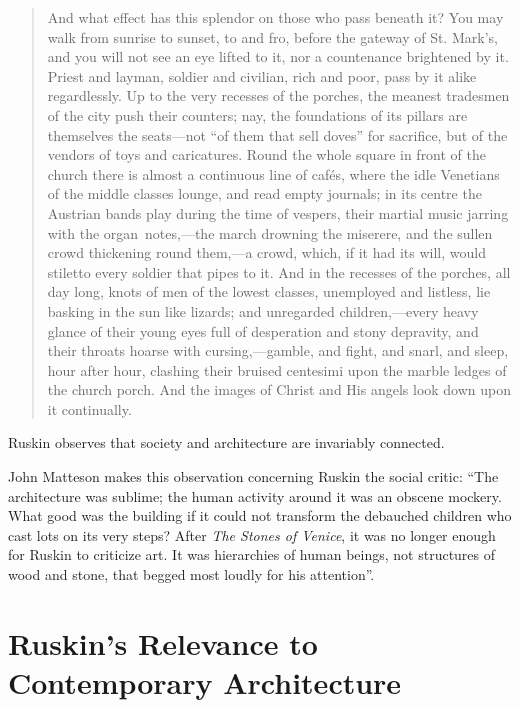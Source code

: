 \begin{quote}
And what effect has this splendor on those who pass beneath it?  You may
walk from sunrise to sunset, to and fro, before the gateway of St.
Mark’s, and you will not see an eye lifted to it, nor a countenance
brightened by it.  Priest and layman, soldier and civilian, rich and
poor, pass by it alike regardlessly.  Up to the very recesses of the
porches, the meanest tradesmen of the city push their counters; nay,
the foundations of its pillars are themselves the seats—not “of them
that sell doves” for sacrifice, but of the vendors of toys and
caricatures.  Round the whole square in front of the church there is
almost a continuous line of cafés, where the idle Venetians of the
middle classes lounge, and read empty journals; in its centre the
Austrian bands play during the time of vespers, their martial music
jarring with the organ~notes,—the march drowning the miserere, and the
sullen crowd thickening round them,—a crowd, which, if it had its will,
would stiletto every soldier that pipes to it.  And in the recesses of
the porches, all day long, knots of men of the lowest classes,
unemployed and listless, lie basking in the sun like lizards; and
unregarded children,—every heavy glance of their young eyes full of
desperation and stony depravity, and their throats hoarse with
cursing,—gamble, and fight, and snarl, and sleep, hour after hour,
clashing their bruised centesimi upon the marble ledges of the church
porch.  And the images of Christ and His angels look down upon it
continually.\citep[][vol. 2, ch. 4, sec. 15]{ruskin1885}
\end{quote}

Ruskin observes that society and architecture are invariably connected.

John Matteson makes this observation concerning Ruskin the social
critic: ``The architecture was sublime; the human activity
around it was an obscene mockery.  What good was the building if it
could not transform the debauched children who cast lots on its very
steps?  After \textit{The Stones of Venice}, it was no longer enough
for Ruskin to criticize art.  It was hierarchies of human beings, not
structures of wood and stone, that begged most loudly for his
attention''\citep[][pg. 302]{matteson2002}.

\section{Ruskin's Relevance to Contemporary Architecture}


